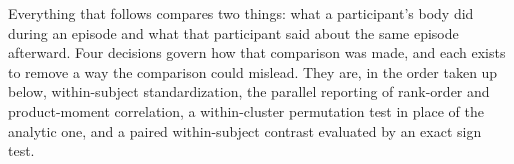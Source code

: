 
Everything that follows compares two things: what a participant's body did during an episode
and what that participant said about the same episode afterward. Four decisions govern how that
comparison was made, and each exists to remove a way the comparison could mislead. They are, in
the order taken up below, within-subject standardization, the parallel reporting of rank-order
and product-moment correlation, a within-cluster permutation test in place of the analytic one,
and a paired within-subject contrast evaluated by an exact sign test.

